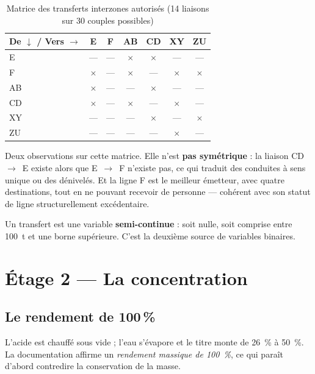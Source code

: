 \begin{table}[H]
\centering
\caption{Matrice des transferts interzones autorisés (14 liaisons sur 30 couples possibles)}
\label{tab:matrice-interzone}
\begin{tabular}{@{}l*{6}{c}@{}}
\toprule
\textbf{De $\downarrow$ / Vers $\rightarrow$} & \textbf{E} & \textbf{F} & \textbf{AB} & \textbf{CD} & \textbf{XY} & \textbf{ZU} \\
\midrule
E  & --- & --- & $\times$ & $\times$ & --- & --- \\
F  & $\times$ & --- & $\times$ & --- & $\times$ & $\times$ \\
AB & $\times$ & --- & --- & $\times$ & --- & --- \\
CD & $\times$ & --- & $\times$ & --- & $\times$ & --- \\
XY & --- & --- & --- & $\times$ & --- & $\times$ \\
ZU & --- & --- & --- & --- & $\times$ & --- \\
\bottomrule
\end{tabular}
\end{table}

Deux observations sur cette matrice. Elle n'est \textbf{pas symétrique} : la liaison
CD~$\to$~E existe alors que E~$\to$~F n'existe pas, ce qui traduit des conduites à sens
unique ou des dénivelés. Et la ligne F est le meilleur émetteur, avec quatre destinations,
tout en ne pouvant recevoir de personne --- cohérent avec son statut de ligne
structurellement excédentaire.

\begin{encadre}[title={Conséquence pour le modèle}]
Un transfert est une variable \textbf{semi-continue} : soit nulle, soit comprise entre
\SI{100}{\tonne} et une borne supérieure. C'est la deuxième source de variables binaires.
\end{encadre}

\section{Étage 2 --- La concentration}
\label{sec:concentration}

\subsection{Le rendement de 100\,\%}

L'acide est chauffé sous vide ; l'eau s'évapore et le titre monte de \SI{26}{\percent} à
\SI{50}{\percent}. La documentation affirme un \emph{rendement massique de
\SI{100}{\percent}}, ce qui paraît d'abord contredire la conservation de la masse.

